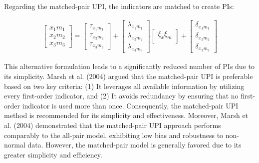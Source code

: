\documentclass[
  man,mask]{apa6}
\begin{document}
Regarding the matched-pair UPI, the indicators are matched to create PIs:

\begin{align}
    \begin{bmatrix}
        x_{1}m_{1} \\
        x_{2}m_{2} \\
        x_{3}m_{3}
    \end{bmatrix} =
    \begin{bmatrix}
        \tau_{x_{1}m_{1}} \\
        \tau_{x_{2}m_{2}} \\ 
        \tau_{x_{3}m_{3}}
    \end{bmatrix} + 
    \begin{bmatrix}
        \lambda_{x_{1}m_{1}} \\
        \lambda_{x_{2}m_{2}} \\ 
        \lambda_{x_{3}m_{3}} 
    \end{bmatrix}
    \begin{bmatrix}
        \xi_{x}\xi_{m} \\
    \end{bmatrix} +
    \begin{bmatrix}
        \delta_{x_{1}m_{1}} \\
        \delta_{x_{2}m_{2}} \\ 
        \delta_{x_{3}m_{3}}
    \end{bmatrix}
\end{align}

This alternative formulation leads to a significantly reduced number of PIs due to its simplicity. Marsh et al. (2004) argued that the matched-pair UPI is preferable based on two key criteria: (1) It leverages all available information by utilizing every first-order indicator, and (2) It avoids redundancy by ensuring that no first-order indicator is used more than once. Consequently, the matched-pair UPI method is recommended for its simplicity and effectiveness. Moreover, Marsh et al. (2004) demonstrated that the matched-pair UPI approach performs comparably to the all-pair model, exhibiting low bias and robustness to non-normal data. However, the matched-pair model is generally favored due to its greater simplicity and efficiency.
\end{document}
